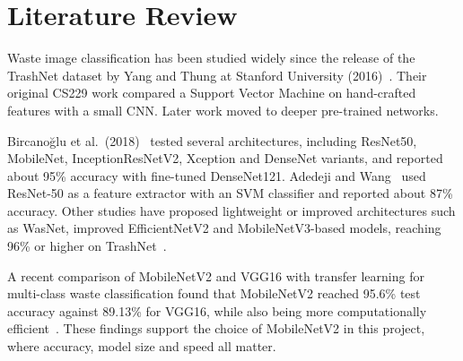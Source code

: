 \section{Literature Review}
Waste image classification has been studied widely since the release of the TrashNet dataset by Yang and Thung at Stanford University (2016)~\cite{yang}. Their original CS229 work compared a Support Vector Machine on hand-crafted features with a small CNN. Later work moved to deeper pre-trained networks.

Bircano\u{g}lu et al.\ (2018)~\cite{recyclenet} tested several architectures, including ResNet50, MobileNet, InceptionResNetV2, Xception and DenseNet variants, and reported about 95\% accuracy with fine-tuned DenseNet121. Adedeji and Wang~\cite{adedeji} used ResNet-50 as a feature extractor with an SVM classifier and reported about 87\% accuracy. Other studies have proposed lightweight or improved architectures such as WasNet, improved EfficientNetV2 and MobileNetV3-based models, reaching 96\% or higher on TrashNet~\cite{effnet}.

A recent comparison of MobileNetV2 and VGG16 with transfer learning for multi-class waste classification found that MobileNetV2 reached 95.6\% test accuracy against 89.13\% for VGG16, while also being more computationally efficient~\cite{mobvgg}. These findings support the choice of MobileNetV2 in this project, where accuracy, model size and speed all matter.
